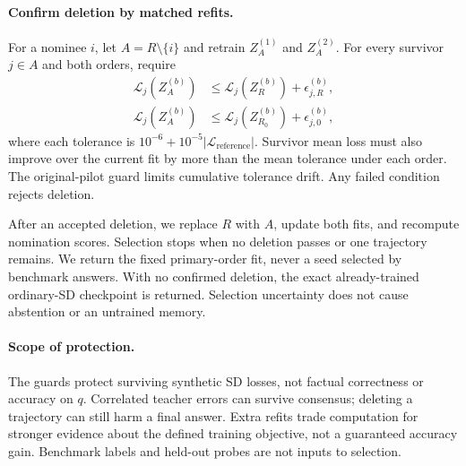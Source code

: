\paragraph{Confirm deletion by matched refits.}
For a nominee $i$, let $A=R\setminus\{i\}$ and retrain $Z_A^{(1)}$ and $Z_A^{(2)}$. For every survivor $j\in A$ and both orders, require
\begin{align}
\mathcal L_j(Z_A^{(b)})&\leq\mathcal L_j(Z_R^{(b)})+\epsilon_{j,R}^{(b)},\\
\mathcal L_j(Z_A^{(b)})&\leq\mathcal L_j(Z_{R_0}^{(b)})+\epsilon_{j,0}^{(b)},
\end{align}
where each tolerance is $10^{-6}+10^{-5}|\mathcal L_{\mathrm{reference}}|$. Survivor mean loss must also improve over the current fit by more than the mean tolerance under each order. The original-pilot guard limits cumulative tolerance drift. Any failed condition rejects deletion.

After an accepted deletion, we replace $R$ with $A$, update both fits, and recompute nomination scores. Selection stops when no deletion passes or one trajectory remains. We return the fixed primary-order fit, never a seed selected by benchmark answers. With no confirmed deletion, the exact already-trained ordinary-SD checkpoint is returned. Selection uncertainty does not cause abstention or an untrained memory.

\paragraph{Scope of protection.}
The guards protect surviving synthetic SD losses, not factual correctness or accuracy on $q$. Correlated teacher errors can survive consensus; deleting a trajectory can still harm a final answer. Extra refits trade computation for stronger evidence about the defined training objective, not a guaranteed accuracy gain. Benchmark labels and held-out probes are not inputs to selection.
